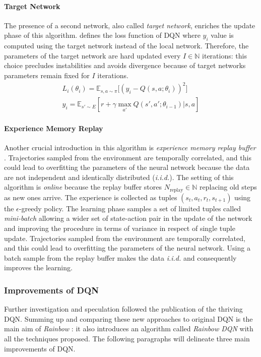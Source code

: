 \paragraph{Target Network}
The presence of a second network, also called  \textit{target network}, enriches the update phase of this algorithm. 
defines the loss function of DQN where $y_i$ value is computed using the target network instead of the local network. Therefore, the parameters of the target network are hard updated every $I \in \mathbb{N}$ iterations: this choice precludes instabilities and avoids divergence because of target networks parameters remain fixed for $I$ iterations.
\begin{equation} \label{eq:lossdqn}
	\begin{gathered}
		L_i(\theta_i) = \mathbb{E}_{s, a \sim \pi}\big[(y_i - Q(s, a; \theta_i))^2\big]\\
		y_i = \mathbb{E}_{s' \sim E}[r + \gamma \max_{a'}Q(s',a'; \theta_{i-1})|s,a]
	\end{gathered}
\end{equation}

\paragraph{Experience Memory Replay} \label{experience}

Another crucial introduction in this algorithm is \textit{experience memory replay buffer} \cite{lin1992self}. Trajectories sampled from the environment are temporally correlated, and this could lead to overfitting the parameters of the neural network because the data are not independent and identically distributed (\textit{i.i.d.}). The setting of this algorithm is \textit{online} because the replay buffer stores $N_{\text{replay}} \in \mathbb{N}$ replacing old steps as new ones arrive. The experience is collected as tuples $(s_t,a_t,r_t,s_{t+1})$ using the $\epsilon$-greedy policy. The learning phase samples a set of limited tuples called \textit{mini-batch} allowing a wider set of state-action pair in the update of the network and improving the procedure in terms of variance in respect of single tuple update.
Trajectories sampled from the environment are temporally correlated, and this could lead to overfitting the parameters of the neural network. Using a batch sample from the replay buffer makes the data \textit{i.i.d.} and consequently improves the learning.

\subsubsection{Improvements of DQN}
Further investigation and speculation followed the publication of the thriving DQN. Summing up and comparing these new approaches to original DQN is the main aim of \textit{Rainbow} \cite{hessel2018rainbow}: it also introduces an algorithm called \textit{Rainbow DQN} with all the techniques proposed. The following paragraphs will delineate three main improvements of DQN.

